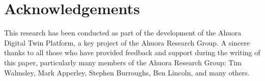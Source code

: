 \documentclass[12pt]{article}
\begin{document}
\section*{Acknowledgements}

This research has been conducted as part of the development of the Ahuora Digital Twin Platform, a key project of the Ahuora Research Group. A sincere thanks to all those who have provided feedback and support during the writing of this paper, particularly many members of the Ahuora Research Group: Tim Walmsley, Mark Apperley, Stephen Burroughs, Ben Lincoln, and many others.



\end{document}
